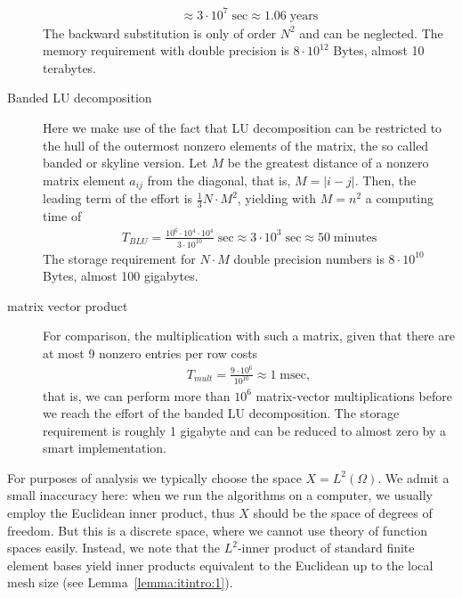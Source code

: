 \begin{intro}
\begin{description}
\begin{gather*}
      \approx 3\cdot10^7 \;\text{sec}
      \approx 1.06 \;\text{years}
    \end{gather*}
    The backward substitution is only of order $N^2$ and can be
    neglected. The memory requirement with double precision is
    $8\cdot10^{12}$ Bytes, almost 10 terabytes.
  \item[Banded LU decomposition] Here we make use of the fact that LU
    decomposition can be restricted to the hull of the outermost
    nonzero elements of the matrix, the so called banded or skyline
    version. Let $M$ be the greatest distance of a nonzero matrix
    element $a_{ij}$ from the diagonal, that is, $M=\left|i-j\right|$. Then,
    the leading term of the effort is $\tfrac13 N\cdot M^2$, yielding
    with $M=n^2$ a computing time of
      \begin{gather*}
        T_{BLU} = \frac{10^{6}\cdot 10^{4} \cdot 10^{4}}{3\cdot 10^{10}} \;\text{sec}
      \approx 3\cdot10^3 \;\text{sec}
      \approx 50 \;\text{minutes}
      \end{gather*}
      The storage requirement for $N\cdot M$ double precision numbers
      is $8\cdot 10^{10}$ Bytes, almost 100 gigabytes.
    \item[matrix vector product] For comparison, the multiplication
      with such a matrix, given that there are at most 9 nonzero
      entries per row costs
      \begin{gather*}
        T_{mult} = \frac{9\cdot 10^6}{10^{10}} \approx 1 \;\text{msec},
      \end{gather*}
      that is, we can perform more than $10^6$ matrix-vector
      multiplications before we reach the effort of the banded LU
      decomposition. The storage requirement is roughly 1 gigabyte and
      can be reduced to almost zero by a smart implementation.
  \end{description}
\end{intro}

\begin{remark}
  For purposes of analysis we typically choose the space $X =
  L^2(\Omega)$. We admit a small inaccuracy here: when we run the
  algorithms on a computer, we usually employ the Euclidean inner
  product, thus $X$ should be the space of degrees of freedom. But
  this is a discrete space, where we cannot use theory of function
  spaces easily. Instead, we note that the $L^2$-inner product of
  standard finite element bases yield inner products equivalent to the
  Euclidean up to the local mesh size (see Lemma~\ref{lemma:itintro:1}).
\end{remark}

